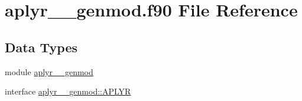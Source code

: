 \hypertarget{aplyr____genmod_8f90}{\section{aplyr\+\_\+\+\_\+genmod.\+f90 File Reference}
\label{aplyr____genmod_8f90}
}
\subsection*{Data Types}
\begin{DoxyCompactItemize}
\item 
module \hyperlink{classaplyr____genmod}{aplyr\+\_\+\+\_\+genmod}
\item 
interface \hyperlink{interfaceaplyr____genmod_1_1APLYR}{aplyr\+\_\+\+\_\+genmod\+::\+A\+P\+L\+Y\+R}
\end{DoxyCompactItemize}
